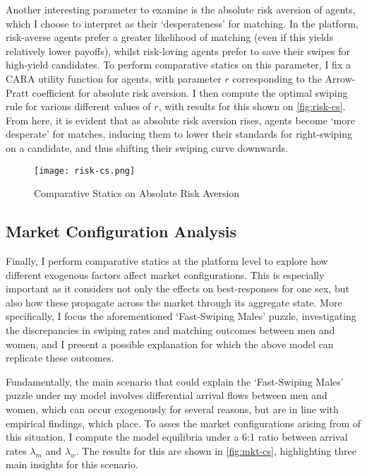 Another interesting parameter to examine is the absolute risk aversion of agents, which I choose to interpret as their `desperateness' for matching.
In the platform, risk-averse agents prefer a greater likelihood of matching (even if this yields relatively lower payoffs), whilst risk-loving agents prefer to save their swipes for high-yield candidates. 
To perform comparative statics on this parameter, I fix a CARA utility function for agents, with parameter $r$ corresponding to the Arrow-Pratt coefficient for absolute risk aversion. 
I then compute the optimal swiping rule for various different values of $r$, with results for this shown on \autoref{fig:risk-cs}.
From here, it is evident that as absolute risk aversion rises, agents become `more desperate' for matches, inducing them to lower their standards for right-swiping on a candidate, and thus shifting their swiping curve downwards.

\begin{figure}[ht]
    \centering
    \caption{Comparative Statics on Absolute Risk Aversion}
    \texttt{[image: risk-cs.png]}
    \label{fig:risk-cs} 
\end{figure}

\subsection{Market Configuration Analysis}\label{sec:section3.3} 
Finally, I perform comparative statics at the platform level to explore how different exogenous factors affect market configurations. 
This is especially important as it considers not only the effects on best-responses for one sex, but also how these propagate across the market through its aggregate state. 
More specifically, I focus the aforementioned `Fast-Swiping Males' puzzle, investigating the discrepancies in swiping rates and matching outcomes between men and women, and I present a possible explanation for which the above model can replicate these outcomes. 

Fundamentally, the main scenario that could explain the `Fast-Swiping Males' puzzle under my model involves differential arrival flows between men and women, which can occur exogenously for several reasons, but are in line with empirical findings, which place. 
To asses the market configurations arising from of this situation, I compute the model equilibria under a 6:1 ratio between arrival rates $\lambda_m$ and $\lambda_w$. The results for this are shown in \autoref{fig:mkt-cs}, highlighting three main insights for this scenario. 

